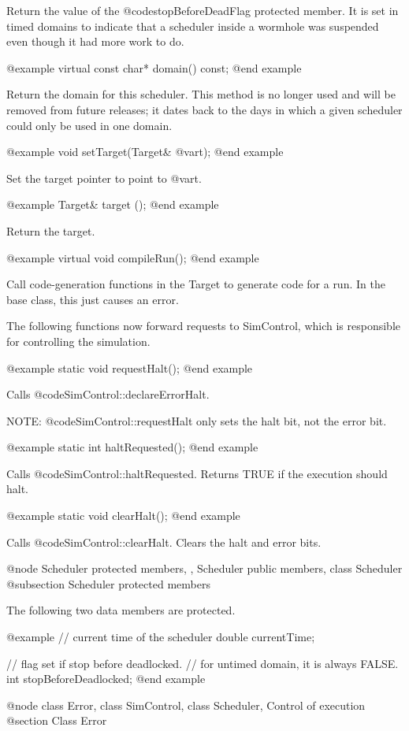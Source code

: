 Return the value of the @code{stopBeforeDeadFlag} protected member.
It is set in timed domains to indicate that a scheduler inside a
wormhole was suspended even though it had more work to do.

@example
virtual const char* domain() const;
@end example

Return the domain for this scheduler.  This method is no longer used and
will be removed from future releases; it dates back to the days
in which a given scheduler could only be used in one domain.

@example
void setTarget(Target& @var{t});
@end example

Set the target pointer to point to @var{t}.

@example
Target& target ();
@end example

Return the target.

@example
virtual void compileRun();
@end example

Call code-generation functions in the Target to generate
code for a run.
In the base class, this just causes an error.

The following functions now forward requests to SimControl,
which is responsible for controlling the simulation.

@example
static void requestHalt();
@end example

Calls @code{SimControl::declareErrorHalt}.

NOTE: @code{SimControl::requestHalt} only sets the halt bit,
not the error bit.

@example
static int haltRequested();
@end example

Calls @code{SimControl::haltRequested}.  Returns TRUE if the
execution should halt.

@example
static void clearHalt();
@end example

Calls @code{SimControl::clearHalt}.  Clears the halt and error
bits.

@node Scheduler protected members,  , Scheduler public members, class Scheduler
@subsection Scheduler protected members

The following two data members are protected.

@example
// current time of the scheduler
double currentTime;

// flag set if stop before deadlocked.
// for untimed domain, it is always FALSE.
int stopBeforeDeadlocked;
@end example

@node class Error, class SimControl, class Scheduler, Control of execution
@section Class Error

